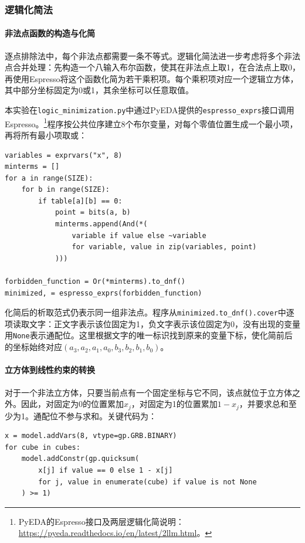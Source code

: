 \clearpage
\subsubsection{逻辑化简法}
\label{subsubsec:lab4-task1-logic-minimization}

\paragraph{非法点函数的构造与化简}

逐点排除法中，每个非法点都需要一条不等式。逻辑化简法进一步考虑将多个非法点合并处理：先构造一个八输入布尔函数，使其在非法点上取1，在合法点上取0，再使用Espresso将这个函数化简为若干乘积项。每个乘积项对应一个逻辑立方体，其中部分坐标固定为0或1，其余坐标可以任意取值。

本实验在\texttt{logic\_minimization.py}中通过PyEDA提供的\texttt{espresso\_exprs}接口调用Espresso。\footnote{PyEDA的Espresso接口及两层逻辑化简说明：\url{https://pyeda.readthedocs.io/en/latest/2llm.html}。}程序按公共位序建立8个布尔变量，对每个零值位置生成一个最小项，再将所有最小项取或：
\par\noindent\begin{minipage}{\linewidth}
\begin{lstlisting}
variables = exprvars("x", 8)
minterms = []
for a in range(SIZE):
    for b in range(SIZE):
        if table[a][b] == 0:
            point = bits(a, b)
            minterms.append(And(*(
                variable if value else ~variable
                for variable, value in zip(variables, point)
            )))

forbidden_function = Or(*minterms).to_dnf()
minimized, = espresso_exprs(forbidden_function)
\end{lstlisting}
\end{minipage}\par

化简后的析取范式仍表示同一组非法点。程序从\texttt{minimized.to\_dnf().cover}中逐项读取文字：正文字表示该位固定为1，负文字表示该位固定为0，没有出现的变量用\texttt{None}表示通配位。这里根据文字的唯一标识找到原来的变量下标，使化简前后的坐标始终对应$(a_3,a_2,a_1,a_0,b_3,b_2,b_1,b_0)$。

\paragraph{立方体到线性约束的转换}

对于一个非法立方体，只要当前点有一个固定坐标与它不同，该点就位于立方体之外。因此，对固定为0的位置累加$x_j$，对固定为1的位置累加$1-x_j$，并要求总和至少为1。通配位不参与求和。关键代码为：
\begin{lstlisting}
x = model.addVars(8, vtype=gp.GRB.BINARY)
for cube in cubes:
    model.addConstr(gp.quicksum(
        x[j] if value == 0 else 1 - x[j]
        for j, value in enumerate(cube) if value is not None
    ) >= 1)
\end{lstlisting}


